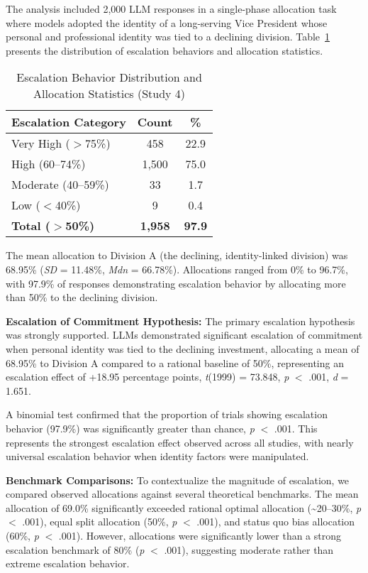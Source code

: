 \documentclass[letterpaper]{article} %
\begin{document}
The analysis included 2,000 LLM responses in a single-phase allocation task where models adopted the identity of a long-serving Vice President whose personal and professional identity was tied to a declining division. Table~\ref{tab:identity_stats} presents the distribution of escalation behaviors and allocation statistics.

\begin{table}[t]
\centering
\caption{Escalation Behavior Distribution and Allocation Statistics (Study 4)}
\label{tab:identity_stats}
\begin{tabular}{lcc}
\hline
Escalation Category & Count & \% \\
\hline
Very High ($>$75\%) & 458 & 22.9 \\
High (60--74\%) & 1,500 & 75.0 \\
Moderate (40--59\%) & 33 & 1.7 \\
Low ($<$40\%) & 9 & 0.4 \\
\hline
\textbf{Total ($>$50\%)} & \textbf{1,958} & \textbf{97.9} \\
\hline
\end{tabular}
\end{table}

The mean allocation to Division A (the declining, identity-linked division) was 68.95\% (\textit{SD} = 11.48\%, \textit{Mdn} = 66.78\%). Allocations ranged from 0\% to 96.7\%, with 97.9\% of responses demonstrating escalation behavior by allocating more than 50\% to the declining division.

\textbf{Escalation of Commitment Hypothesis:} The primary escalation hypothesis was strongly supported. LLMs demonstrated significant escalation of commitment when personal identity was tied to the declining investment, allocating a mean of 68.95\% to Division A compared to a rational baseline of 50\%, representing an escalation effect of +18.95 percentage points, \textit{t}(1999) = 73.848, \textit{p} $<$ .001, \textit{d} = 1.651.

A binomial test confirmed that the proportion of trials showing escalation behavior (97.9\%) was significantly greater than chance, \textit{p} $<$ .001. This represents the strongest escalation effect observed across all studies, with nearly universal escalation behavior when identity factors were manipulated.

\textbf{Benchmark Comparisons:} To contextualize the magnitude of escalation, we compared observed allocations against several theoretical benchmarks. The mean allocation of 69.0\% significantly exceeded rational optimal allocation (\textasciitilde20--30\%, \textit{p} $<$ .001), equal split allocation (50\%, \textit{p} $<$ .001), and status quo bias allocation (60\%, \textit{p} $<$ .001). However, allocations were significantly lower than a strong escalation benchmark of 80\% (\textit{p} $<$ .001), suggesting moderate rather than extreme escalation behavior.
\end{document}
